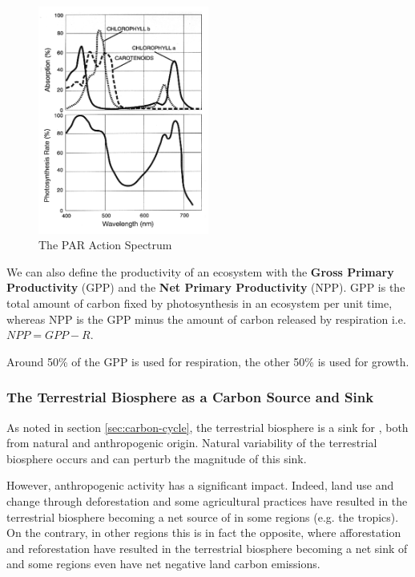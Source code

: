 \begin{figure}[h]
    \centering
    \includegraphics[width=0.5\textwidth]{figures/PAR_spectrum.png}
    \caption{The PAR Action Spectrum}
    \label{fig:PAR_spectrum}
\end{figure}

We can also define the productivity of an ecosystem with the \textbf{Gross Primary Productivity} (GPP) and the \textbf{Net
Primary Productivity} (NPP). GPP is the total amount of carbon fixed by photosynthesis in an ecosystem per unit time,
whereas NPP is the GPP minus the amount of carbon released by respiration i.e. $NPP = GPP - R$.

Around 50\% of the GPP is used for respiration, the other 50\% is used for growth.

\subsubsection{The Terrestrial Biosphere as a Carbon Source and Sink}
\label{sec:terrestrial-carbon-source-sink}

As noted in section \ref{sec:carbon-cycle}, the terrestrial biosphere is a sink for \COtwo, both from natural and
anthropogenic origin. Natural variability of the terrestrial biosphere occurs and can perturb the magnitude of this
sink. 

However, anthropogenic activity has a significant impact. Indeed, land use and change through deforestation and some
agricultural practices have resulted in the terrestrial biosphere becoming a net source of \COtwo in some regions
(e.g. the tropics). On the contrary, in other regions this is in fact the opposite, where afforestation and reforestation
have resulted in the terrestrial biosphere becoming a net sink of \COtwo and some regions even have net negative land
carbon emissions.

